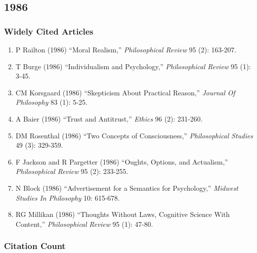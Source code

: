 \documentclass[
  10pt,
  letterpaper,
  DIV=11,
  numbers=noendperiod,
  twoside]{scrartcl}
\providecommand{\tightlist}{%
  \setlength{\itemsep}{0pt}\setlength{\parskip}{0pt}}\usepackage{longtable,booktabs,array}
\begin{document}
\newpage

\subsection{1986}\label{sec-s1986}

\subsubsection*{Widely Cited Articles}\label{widely-cited-articles-30}

\begin{enumerate}
\def\labelenumi{\arabic{enumi}.}
\tightlist
\item
  P Railton (1986) ``Moral Realism,'' \emph{Philosophical Review} 95
  (2): 163-207.
\item
  T Burge (1986) ``Individualism and Psychology,'' \emph{Philosophical
  Review} 95 (1): 3-45.
\item
  CM Korsgaard (1986) ``Skepticism About Practical Reason,''
  \emph{Journal Of Philosophy} 83 (1): 5-25.
\item
  A Baier (1986) ``Trust and Antitrust,'' \emph{Ethics} 96 (2): 231-260.
\item
  DM Rosenthal (1986) ``Two Concepts of Consciousness,''
  \emph{Philosophical Studies} 49 (3): 329-359.
\item
  F Jackson and R Pargetter (1986) ``Oughts, Options, and Actualism,''
  \emph{Philosophical Review} 95 (2): 233-255.
\item
  N Block (1986) ``Advertisement for a Semantics for Psychology,''
  \emph{Midwest Studies In Philosophy} 10: 615-678.
\item
  RG Millikan (1986) ``Thoughts Without Laws, Cognitive Science With
  Content,'' \emph{Philosophical Review} 95 (1): 47-80.
\end{enumerate}

\subsubsection*{Citation Count}\label{sec-count-1986}
\end{document}
